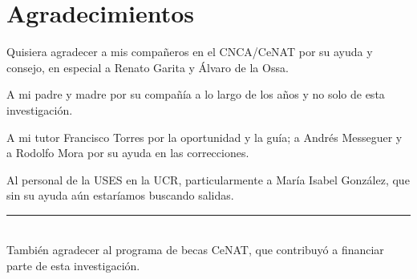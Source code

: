 
\chapter*{Agradecimientos}
\label{sect:Acknowledgment}

Quisiera agradecer a mis compañeros en el CNCA/CeNAT por su ayuda y consejo, en especial a Renato Garita y Álvaro de la Ossa.

A mi padre y madre por su compañía a lo largo de los años y no solo de esta investigación.

A mi tutor Francisco Torres por la oportunidad y la guía; a Andrés Messeguer y a Rodolfo Mora por su ayuda en las correcciones.

Al personal de la USES en la UCR, particularmente a María Isabel González, que sin su ayuda aún estaríamos buscando salidas.

\rule{0.5\textwidth}{0.5pt}\\

También agradecer al programa de becas CeNAT, que contribuyó a financiar parte de esta investigación.
